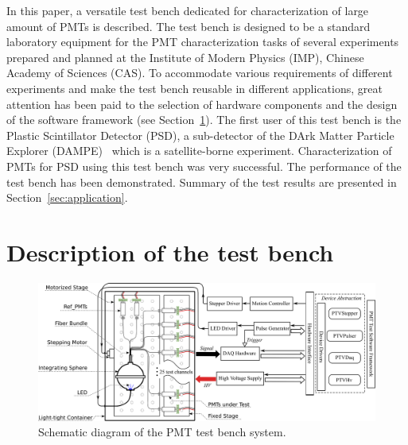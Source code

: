\documentclass{nst}
\providecommand{\DIFadd}[1]{{\protect\color{yellow} \sf #1}} %
\providecommand{\DIFaddbegin}{} %
\providecommand{\DIFaddend}{} %
\providecommand{\DIFdelbegin}{} %
\providecommand{\DIFdelend}{} %
\begin{document}
In this paper, a versatile test bench dedicated for \DIFdelbegin \DIFdelend \DIFaddbegin \DIFadd{characterization of large amount of PMTs is described}\DIFaddend .
The test bench is designed to be a standard laboratory equipment for the PMT characterization tasks of several experiments prepared and planned at the Institute of Modern Physics (IMP), Chinese Academy of Sciences (CAS).
To accommodate \DIFdelbegin \DIFdelend various requirements of different experiments and make the test bench reusable in different applications, \DIFdelbegin \DIFdelend \DIFaddbegin \DIFadd{great }\DIFaddend attention has been paid to the selection of  \DIFdelbegin \DIFdelend hardware components and the design of the software framework (see Section~\ref{sec:description}).
The first user of this test bench is the Plastic Scintillator Detector (PSD), a sub-detector of the DArk Matter Particle Explorer (DAMPE)~\cite{Chang_Jin_dampe} which is a satellite-borne experiment. 
\DIFdelbegin \DIFdelend \DIFaddbegin \DIFadd{Characterization of PMTs for }\DIFaddend PSD using this test bench \DIFdelbegin \DIFdelend \DIFaddbegin \DIFadd{was very successful. The }\DIFaddend performance of the test bench has been \DIFdelbegin \DIFdelend \DIFaddbegin \DIFadd{demonstrated}\DIFaddend .
Summary of the test results \DIFdelbegin \DIFdelend \DIFaddbegin \DIFadd{are }\DIFaddend presented in Section~\ref{sec:application}.

\section{Description of the test bench}
\label{sec:description}

\begin{figure}[!htb]
	\centering
	\includegraphics[width=150mm]{FIG1}
	\caption{Schematic diagram of the PMT test bench system.}
	\label{fig:FIG1}
\end{figure}
\end{document}
